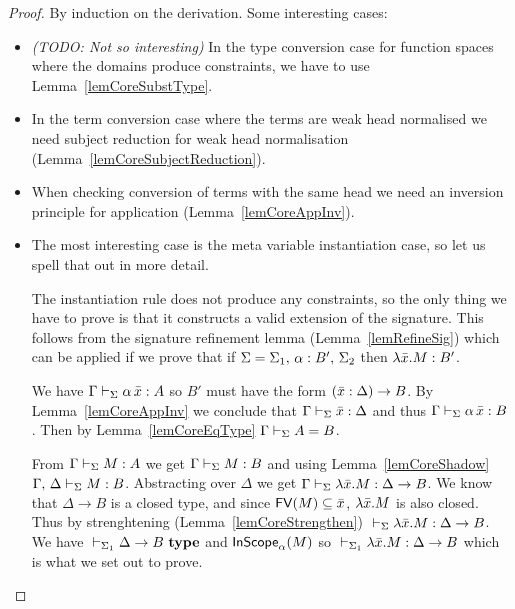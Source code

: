 \begin{proof}
    By induction on the derivation. Some interesting cases:
    \begin{itemize}

	\item {\em (TODO: Not so interesting)} In the type conversion case for
	function spaces where the domains produce constraints, we have to use
	Lemma~\ref{lemCoreSubstType}.

	\item In the term conversion case where the terms are weak head
	normalised we need subject reduction for weak head normalisation
	(Lemma~\ref{lemCoreSubjectReduction}).

	\item When checking conversion of terms with the same head we need an
	inversion principle for application (Lemma~\ref{lemCoreAppInv}).

	\item The most interesting case is the meta variable instantiation
	case, so let us spell that out in more detail.

	The instantiation rule does not produce any constraints, so the only
	thing we have to prove is that it constructs a valid extension of the
	signature. This follows from the signature refinement lemma
	(Lemma~\ref{lemRefineSig}) which can be applied if we prove that if
	$\Sigma = {\Sigma_1},\,{} {{\alpha} : {B'}},\,{} \Sigma_2$ then
	$\lambda \bar x.{} M : {B'}$.

	We have ${\Gamma} \vdash_{\Sigma} {\alpha \, \bar x} : {A}$ so $B'$ must
	have the form $(\bar x:\Delta)\to{} B$. By Lemma~\ref{lemCoreAppInv} we
	conclude that ${\Gamma} \vdash_{\Sigma} {\bar x} : {\Delta}$ and thus
	${\Gamma} \vdash_{\Sigma} {\alpha \, \bar x} : {B}$. Then by
	Lemma~\ref{lemCoreEqType} ${\Gamma} \vdash_{\Sigma}A=B$.

	From ${\Gamma} \vdash_{\Sigma} {M} : {A}$ we get ${\Gamma} \vdash_{\Sigma} {M} : {B}$ and using Lemma~\ref{lemCoreShadow} ${{\Gamma},\,{}
	\Delta} \vdash_{\Sigma} {M} : {B}$. Abstracting over $\Delta$ we get ${\Gamma} \vdash_{\Sigma} {\lambda \bar x.{} M} : {\Delta \to B}$. We know that $\Delta \to B$
	is a closed type, and since $\mathsf{FV}({M}) \subseteq \bar x$, $\lambda \bar x.{}
	M$ is also closed. Thus by strenghtening
	(Lemma~\ref{lemCoreStrengthen}) ${} \vdash_{\Sigma} {\lambda \bar x.{} M} : {\Delta \to B}$. We have ${} \vdash_{\Sigma_1}\Delta \to B ~ \mathbf{type}$ and
	$\mathsf{InScope}_{\alpha}({M})$ so ${} \vdash_{\Sigma_1} {\lambda \bar x.{} M} : {\Delta \to B}$ which is what we set out to prove.


    \end{itemize}
\end{proof}


